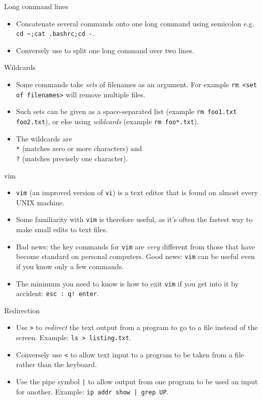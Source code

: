 \documentclass[dvipsnames]{beamer}
\newcommand{\command}[1]{\colorbox{light-gray}{\texttt{#1}}}
\begin{document}
\begin{frame}{Long command lines}
  \begin{itemize}
  \item Concatenate several commands onto one long command using semicolon e.g. \command{cd \textasciitilde;cat .bashrc;cd -}.
  \item Conversely use \command{} to split one long command over two lines.
  \end{itemize}
\end{frame}


\begin{frame}{Wildcards}
  \begin{itemize}
  \item Some commands take \textit{sets} of filenames as an argument. For example \command{rm <set of filenames>} will remove multiple files.
  \item Such sets can be given as a space-separated list (example \command{rm foo1.txt foo2.txt}), or else using \textit{wildcards} (example \command{rm foo*.txt}).
  \item The wildcards are \\ \command{*} (matches zero or more characters) and \\ \command{?} (matches precisely one character).
  \end{itemize}
\end{frame}


\begin{frame}{vim}
  \begin{itemize}
  \item \command{vim} (an improved version of \command{vi}) is a text editor that is found on almost every UNIX machine.
  \item Some familiarity with \command{vim} is therefore useful, as it's often the fastest way to make small edits to text files.
  \item Bad news: the key commands for \command{vim} are \textit{very} different from those that have become standard on personal computers. Good news:  \command{vim} can be useful even if you know only a few commands.
  \item The minimum you need to know is how to exit \command{vim} if you get into it by accident: \command{esc : q! enter}.
  \end{itemize}
\end{frame}


\begin{frame}{Redirection}
  \begin{itemize}
  \item Use \command{>} to \textit{redirect} the text output from a program to go to a file instead of the screen. Example: \command{ls >  listing.txt}.
  \item Conversely use \command{<} to allow text input to a program to be taken from a file rather than the keyboard.
  \item Use the pipe symbol \command{|} to allow output from one program to be used an input for another. Example: \command{ip addr show | grep UP}.
  \end{itemize}
\end{frame}
\end{document}
